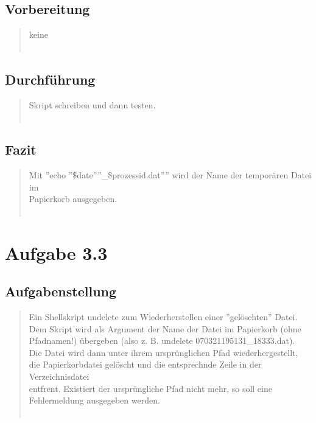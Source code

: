 	\subsection{Vorbereitung}
		\begin{quote}
			keine\\ \\
		\end{quote}
	\subsection{Durchführung}
		\begin{quote}
			Skript schreiben und dann testen.\\ \\
		\end{quote}
	\subsection{Fazit}
		\begin{quote}
			Mit ''echo ''\$date''''\_\$prozessid.dat'''' wird der Name der tempor\"aren Datei im\\
			Papierkorb ausgegeben.\\ \\
		\end{quote}
\newpage
\section{Aufgabe 3.3}
	\subsection{Aufgabenstellung}
		\begin{quote}
			Ein Shellskript undelete zum Wiederherstellen einer ''gel\"oschten'' Datei.\\
			Dem	Skript wird als Argument der Name der Datei im Papierkorb (ohne\\
			Pfadnamen!) \"ubergeben (also z. B. undelete 070321195131\_18333.dat).\\
			Die Datei wird dann unter ihrem urspr\"unglichen Pfad wiederhergestellt,\\
			die Papierkorbdatei gel\"oscht und die entsprechnde Zeile in der Verzeichnisdatei\\
			entfrent. Existiert der urspr\"ungliche Pfad nicht mehr, so soll eine\\
			Fehlermeldung ausgegeben werden.\\ \\
		\end{quote}
